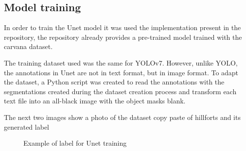 \subsection{Model training}
In order to train the Unet model it was used the implementation present in the repository\cite{unetRep}, the repository already provides a pre-trained model trained with the carvana dataset.

The training dataset used was the same for YOLOv7. However, unlike YOLO, the annotations in Unet are not in text format, but in image format. To adapt the dataset, a Python script was created to read the annotations with the segmentations created during the dataset creation process and transform each text file into an all-black image with the object masks blank.

The next two images show a photo of the dataset copy paste of hillforts and its generated label

\begin{figure}[H]
    \centering
    \qquad
    \caption{Example of label for Unet training}%
\end{figure}

